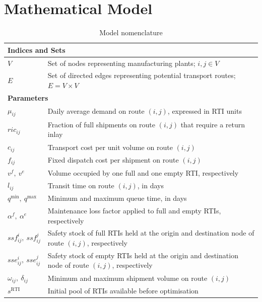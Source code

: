 \section{Mathematical Model}




\begin{longtable}{|p{}|p{}|}
\caption{Model nomenclature}
\label{tab:nomenclature}\\
\hline
\multicolumn{2}{|l|}{\textbf{Indices and Sets}}\\ \hline
$V$
  & Set of nodes representing manufacturing plants; $i, j \in V$ \\
$E$
  & Set of directed edges representing potential transport routes;
    $E = V \times V$ \\
\hline
\multicolumn{2}{|l|}{\textbf{Parameters}}\\ \hline
$\mu_{ij}$
  & Daily average demand on route $(i,j)$, expressed in RTI units \\
$ric_{ij}$
  & Fraction of full shipments on route $(i,j)$ that require
    a return inlay \\
$c_{ij}$
  & Transport cost per unit volume on route $(i,j)$ \\
$f_{ij}$
  & Fixed dispatch cost per shipment on route $(i,j)$ \\
$v^{f},\ v^{e}$
  & Volume occupied by one full and one empty RTI, respectively \\
$l_{ij}$
  & Transit time on route $(i,j)$, in days \\
$q^{\min},\ q^{\max}$
  & Minimum and maximum queue time, in days \\
$\alpha^{f},\ \alpha^{e}$
  & Maintenance loss factor applied to full and empty RTIs,
    respectively \\
$ssf^{i}_{ij},\ ssf^{j}_{ij}$
  & Safety stock of full RTIs held at the origin and destination
    node of route $(i,j)$, respectively \\
$sse^{i}_{ij},\ sse^{j}_{ij}$
  & Safety stock of empty RTIs held at the origin and destination
    node of route $(i,j)$, respectively \\
$\omega_{ij},\ \delta_{ij}$
  & Minimum and maximum shipment volume on route $(i,j)$ \\
$s^{\text{RTI}}$
  & Initial pool of RTIs available before optimisation \\

\end{longtable}
